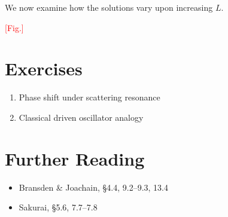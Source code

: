 \documentclass[pra,12pt]{revtex4}
\begin{document}
We now examine how the solutions vary upon increasing $L$.

\textcolor{red}{[Fig.]}





\section*{Exercises}

\begin{enumerate}
\item Phase shift under scattering resonance

\item Classical driven oscillator analogy  
\end{enumerate}




\section*{Further Reading}

\begin{itemize}
\item Bransden \& Joachain, \S4.4, 9.2--9.3, 13.4
\item Sakurai, \S5.6, 7.7--7.8

\end{itemize}
\end{document}
